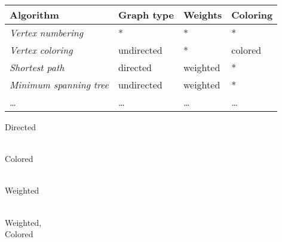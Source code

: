 \begin{frame}{\myframetitle}
	\begin{mycolumns}[columns=4,widths={65,5,15,15},animation=none]
		\begin{tabular}{llll}
			\toprule
			{\bf Algorithm} 							& {\bf Graph type} 	& {\bf Weights} & {\bf Coloring}  \\ \midrule
			{\em Vertex numbering}			  & *          				& *        			& *         			\\
			{\em Vertex coloring}       	& undirected 				& *        			& colored   			\\
			{\em Shortest path}        		& directed   				& weighted 			& *         			\\
			{\em Minimum spanning tree} 	& undirected 				& weighted 			& *         			\\
			\ldots         					& \ldots 			 			& \ldots 		  	& \ldots 					\\ \bottomrule
		\end{tabular}
		\vspace{5mm}	
	\mynextcolumn
	\mynextcolumn
		\begin{exampletight}{Directed\\~}
		\end{exampletight}	
		\begin{exampletight}{Colored\\~}
		\end{exampletight}
	\mynextcolumn
		\begin{exampletight}{Weighted\\~}
		\end{exampletight}
		\begin{exampletight}{Weighted,\\Colored}
		\end{exampletight}
	\end{mycolumns}
\end{frame}
